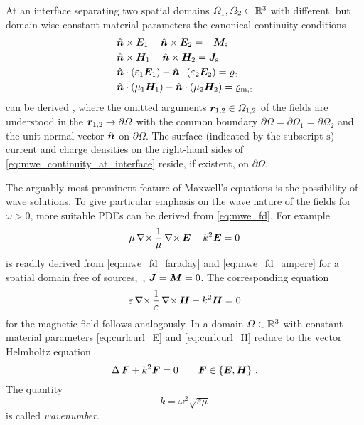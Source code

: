 At an interface separating two spatial domains $\Omega_1, \Omega_2 \subset \mathbb{R}^3$
with different, but domain-wise constant material parameters the canonical
continuity conditions
\begin{subequations}\label{eq:mwe_continuity_at_interface}
	\begin{align}
		&\uv{n} \times \pvec{E}_1 - \uv{n} \times \pvec{E}_2 =
		- \pvec{M}_\mathrm{s} \\
		&\uv{n} \times \pvec{H}_1 - \uv{n} \times \pvec{H}_2 =
		\pvec{J}_\mathrm{s} \\
		&\uv{n} \cdot \left(\varepsilon_1 \pvec{E}_1\right) -
		\uv{n} \cdot \left(\varepsilon_2 \pvec{E}_2\right) = 
		\varrho_\mathrm{s} \\
		&\uv{n} \cdot \left(\mu_1 \pvec{H}_1\right) -
		\uv{n} \cdot \left(\mu_2 \pvec{H}_2\right) = 
		\varrho_\mathrm{m,s}
	\end{align}
\end{subequations}
can be derived \cite[p20]{Jackson2013}, where the omitted arguments
$\robs_{1,2} \in \Omega_{1,2}$ of the fields are understood in the
$\robs_{1,2} \to \partial \Omega$ with the common boundary
$\partial \Omega = \partial \Omega_1 = \partial \Omega_2$ and the unit normal
vector $\uv{n}$ on $\partial \Omega$.
The surface (indicated by the subscript $\mathrm{s}$) current and charge
densities on the right-hand sides of \eqref{eq:mwe_continuity_at_interface}
reside, if existent, on $\partial\Omega$.

The arguably most prominent feature of Maxwell's equations is the possibility
of wave solutions.
To give particular emphasis on the wave nature of the fields for $\omega > 0$,
more suitable \acp{PDE} can be derived from \eqref{eq:mwe_fd}.
For example
\begin{equation}\label{eq:curlcurl_E}
	\mu\curl\frac{1}{\mu}\curl\pvec{E} - k^2\pvec{E} = 0 
\end{equation}
is readily derived from \eqref{eq:mwe_fd_faraday} and \eqref{eq:mwe_fd_ampere}
for a spatial domain free of sources,~\ie, $\pvec{J} = \pvec{M} = 0$.
The corresponding equation
\begin{equation}\label{eq:curlcurl_H}
	\varepsilon\curl\frac{1}{\varepsilon}\curl\pvec{H} - k^2\pvec{H} = 0
\end{equation}
for the magnetic field follows analogously.
In a domain $\Omega \in \mathbb{R}^3$ with constant material parameters
\eqref{eq:curlcurl_E} and \eqref{eq:curlcurl_H} reduce to the vector Helmholtz
equation
\begin{equation}\label{eq:vector_helmholtz_equation}
	\laplace \pvec{F} + k^2 \pvec{F} = 0 \qquad
	\pvec{F} \in \left\{\pvec{E}, \pvec{H}\right\}
	\, .
\end{equation}
The quantity
\begin{equation}\label{eq:wavenumber}
	k = \omega^2 \sqrt{\varepsilon \mu}
\end{equation}
is called \emph{wavenumber}.

